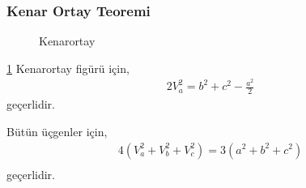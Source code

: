 \subsubsection{Kenar Ortay Teoremi}
    
\begin{figure}[h!]
    \centering
    \caption{Kenarortay}
    \label{fig:median}
\end{figure}

\ref{fig:median} Kenarortay figürü için,
\begin{equation}
    \begin{aligned}
        2 V_a^2 = b^2 + c^2 - \frac{a^2}{2}
    \end{aligned}
\end{equation}
geçerlidir. \par \vspace*{0.5cm}
Bütün üçgenler için,
\begin{equation}
    \begin{aligned}
    4(V_a^2 + V_b^2 + V_c^2) = 3(a^2 + b^2 + c^2) \\
    \end{aligned}
\end{equation}
geçerlidir.